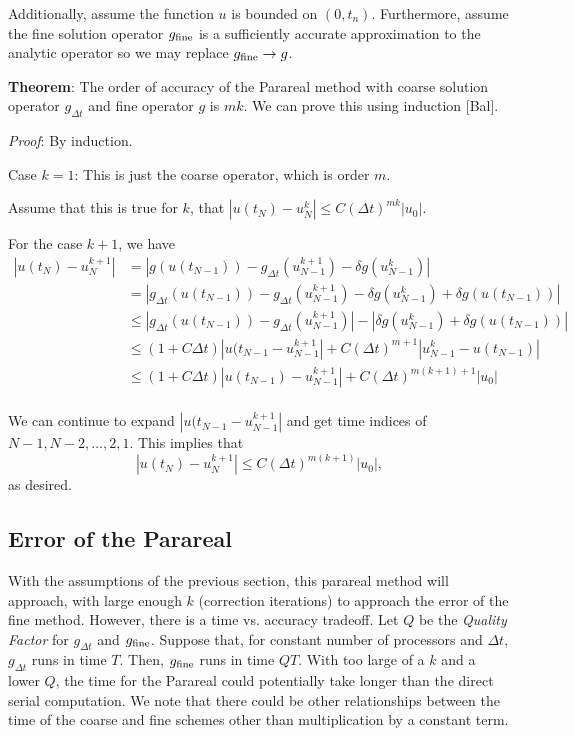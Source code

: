 \documentclass[letterpaper,12pt]{article}
\begin{document}
Additionally, assume the function $u$ is bounded on $(0, t_n)$. Furthermore,
assume the fine solution operator $g_{\textnormal{fine}}$ is a sufficiently
accurate approximation to the analytic operator so we may replace
$g_{\textnormal{fine}} \to g$. 

\textbf{Theorem}: The order of accuracy of the Parareal method with coarse
solution operator $g_{\Delta t}$ and fine operator $g$ is $mk$. We can prove
this using induction [Bal]. 

\emph{Proof}: By induction. 

Case $k = 1$: This is just the coarse operator, which is order $m$. 

Assume that this is true for $k$, that $|u(t_N) - u^k_N| \leq C(\Delta t)^{mk}
|u_0|$. 

For the case $k + 1$, we have
\[
\begin{aligned}
    |u(t_N) - u^{k+1}_N| &= 
    |g(u(t_{N-1})) - g_{\Delta t}(u^{k+1}_{N-1}) - \delta g(u^k_{N-1})| \\
    &= |g_{\Delta t}(u(t_{N-1})) - g_{\Delta t}(u^{k+1}_{N-1}) - \delta
    g(u^k_{N-1}) + \delta g(u(t_{N-1}))| \\
    &\leq |g_{\Delta t}(u(t_{N-1})) - g_{\Delta t}(u^{k+1}_{N-1})| - |\delta
    g(u^k_{N-1}) + \delta g(u(t_{N-1}))| \\
    &\leq (1 + C \Delta t) |u(t_{N-1} - u_{N-1}^{k+1}| + C(\Delta t)^{m+1} |
    u_{N-1}^k - u(t_{N-1}) | \\
    &\leq (1 + C \Delta t) |u(t_{N-1}) - u_{N-1}^{k+1}| + C(\Delta t)^{m(k+1)+1}
    | u_0 | \\
\end{aligned}
\]

We can continue to expand $|u(t_{N-1} - u_{N-1}^{k+1}|$ and get time indices of
$N-1, N-2, \ldots, 2, 1$. This implies that 
\[ |u(t_N) - u^{k+1}_N| \leq C(\Delta t)^{m(k+1)} |u_0|, \]
as desired. 

\subsection{Error of the Parareal}

With the assumptions of the previous section, this parareal method will
approach, with large enough $k$ (correction iterations) to approach the error of
the fine method. However, there is a time vs. accuracy tradeoff. Let $Q$ be the
\emph{Quality Factor} for $g_{\Delta t}$ and $g_{\textnormal{fine}}$. Suppose
that, for constant number of processors and $\Delta t$, $g_{\Delta t}$ runs in
time $T$. Then, $g_{\textnormal{fine}}$ runs in time $QT$. With too large of a
$k$ and a lower $Q$, the time for the Parareal could potentially take longer
than the direct serial computation. We note that there could be other
relationships between the time of the coarse and fine schemes other than
multiplication by a constant term. 
\end{document}
